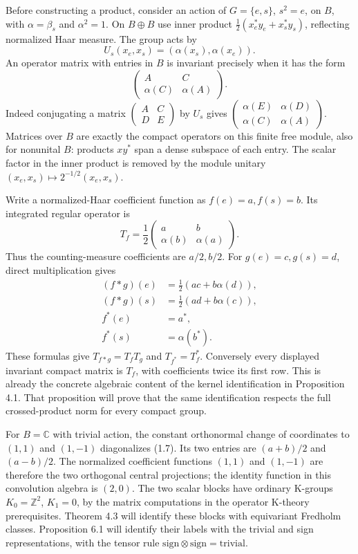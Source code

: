 \documentclass[
  11pt,
]{article}
\begin{document}
Before constructing a product, consider an action of \(G=\{e,s\}\),
\(s^2=e\), on \(B\), with \(\alpha=\beta_s\) and \(\alpha^2=1\). On
\(B\oplus B\) use inner product \(\frac12(x_e^*y_e+x_s^*y_s)\),
reflecting normalized Haar measure. The group acts by \[
U_s(x_e,x_s)=(\alpha(x_s),\alpha(x_e)).
\] An operator matrix with entries in \(B\) is invariant precisely when
it has the form \[
\begin{pmatrix}A&C\\\alpha(C)&\alpha(A)\end{pmatrix}.
\] Indeed conjugating a matrix \(\begin{pmatrix}A&C\\D&E\end{pmatrix}\)
by \(U_s\) gives
\(\begin{pmatrix}\alpha(E)&\alpha(D)\\\alpha(C)&\alpha(A)\end{pmatrix}\).
Matrices over \(B\) are exactly the compact operators on this finite
free module, also for nonunital \(B\): products \(xy^*\) span a dense
subspace of each entry. The scalar factor in the inner product is
removed by the module unitary \((x_e,x_s)\mapsto2^{-1/2}(x_e,x_s)\).

Write a normalized-Haar coefficient function as \(f(e)=a,f(s)=b\). Its
integrated regular operator is \[
T_f=\frac12
\begin{pmatrix}a&b\\\alpha(b)&\alpha(a)\end{pmatrix}.
\tag{1.7}
\] Thus the counting-measure coefficients are \(a/2,b/2\). For
\(g(e)=c,g(s)=d\), direct multiplication gives \[
\begin{aligned}
(f*g)(e)&=\tfrac12(ac+b\alpha(d)),\\
(f*g)(s)&=\tfrac12(ad+b\alpha(c)),\\
f^*(e)&=a^*,\\
f^*(s)&=\alpha(b^*).
\end{aligned}
\tag{1.8}
\] These formulas give \(T_{f*g}=T_fT_g\) and \(T_{f^*}=T_f^*\).
Conversely every displayed invariant compact matrix is \(T_f\), with
coefficients twice its first row. This is already the concrete algebraic
content of the kernel identification in Proposition 4.1. That
proposition will prove that the same identification respects the full
crossed-product norm for every compact group.

For \(B=\mathbb C\) with trivial action, the constant orthonormal change
of coordinates to \((1,1)\) and \((1,-1)\) diagonalizes (1.7). Its two
entries are \((a+b)/2\) and \((a-b)/2\). The normalized coefficient
functions \((1,1)\) and \((1,-1)\) are therefore the two orthogonal
central projections; the identity function in this convolution algebra
is \((2,0)\). The two scalar blocks have ordinary K-groups
\(K_0=\mathbb Z^2\), \(K_1=0\), by the matrix computations in the
operator K-theory prerequisites. Theorem 4.3 will identify these blocks
with equivariant Fredholm classes. Proposition 6.1 will identify their
labels with the trivial and sign representations, with the tensor rule
\(\mathrm{sign}\otimes\mathrm{sign}=\mathrm{trivial}\).
\end{document}
